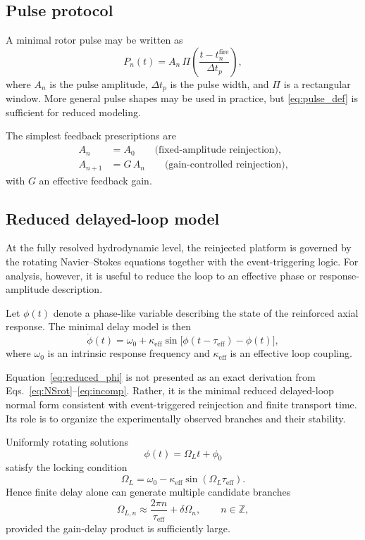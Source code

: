 \documentclass[11pt,a4paper]{article}
\begin{document}
\subsection{Pulse protocol}

A minimal rotor pulse may be written as
\begin{equation}
P_n(t)=A_n\,\Pi\!\left(\frac{t-t_n^{\mathrm{fire}}}{\Delta t_p}\right),
\label{eq:pulse_def}
\end{equation}
where $A_n$ is the pulse amplitude, $\Delta t_p$ is the pulse width, and $\Pi$ is a rectangular window. More general pulse shapes may be used in practice, but \eqref{eq:pulse_def} is sufficient for reduced modeling.

The simplest feedback prescriptions are
\begin{align}
A_n &= A_0 \qquad \text{(fixed-amplitude reinjection),}
\\
A_{n+1} &= G\,A_n \qquad \text{(gain-controlled reinjection),}
\end{align}
with $G$ an effective feedback gain.

\subsection{Reduced delayed-loop model}

At the fully resolved hydrodynamic level, the reinjected platform is governed by the rotating Navier--Stokes equations together with the event-triggering logic. For analysis, however, it is useful to reduce the loop to an effective phase or response-amplitude description.

Let $\phi(t)$ denote a phase-like variable describing the state of the reinforced axial response. The minimal delay model is then
\begin{equation}
\dot{\phi}(t)
=
\omega_0
+
\kappa_{\mathrm{eff}}
\sin\!\bigl[\phi(t-\tau_{\mathrm{eff}})-\phi(t)\bigr],
\label{eq:reduced_phi}
\end{equation}
where $\omega_0$ is an intrinsic response frequency and $\kappa_{\mathrm{eff}}$ is an effective loop coupling.

Equation~\eqref{eq:reduced_phi} is not presented as an exact derivation from Eqs.~\eqref{eq:NSrot}--\eqref{eq:incomp}. Rather, it is the minimal reduced delayed-loop normal form consistent with event-triggered reinjection and finite transport time. Its role is to organize the experimentally observed branches and their stability.

Uniformly rotating solutions
\begin{equation}
\phi(t)=\Omega_L t + \phi_0
\end{equation}
satisfy the locking condition
\begin{equation}
\Omega_L
=
\omega_0 - \kappa_{\mathrm{eff}}\sin(\Omega_L \tau_{\mathrm{eff}}).
\label{eq:locking_condition}
\end{equation}
Hence finite delay alone can generate multiple candidate branches
\begin{equation}
\Omega_{L,n}
\approx
\frac{2\pi n}{\tau_{\mathrm{eff}}} + \delta\Omega_n,
\qquad n\in\mathbb Z,
\end{equation}
provided the gain-delay product is sufficiently large.
\end{document}
